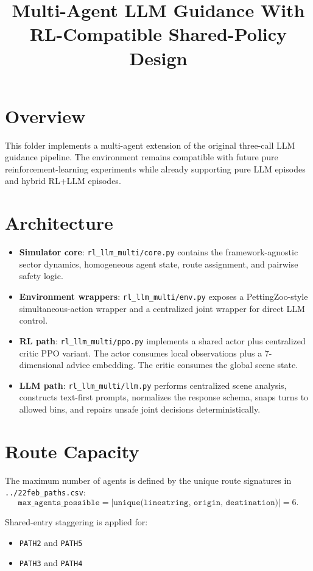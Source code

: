\documentclass[11pt]{article}
\title{Multi-Agent LLM Guidance With RL-Compatible Shared-Policy Design}
\author{}
\date{}
\begin{document}
\maketitle

\section{Overview}
This folder implements a multi-agent extension of the original three-call LLM guidance pipeline. The environment remains compatible with future pure reinforcement-learning experiments while already supporting pure LLM episodes and hybrid RL+LLM episodes.

\section{Architecture}
\begin{itemize}[leftmargin=*]
\item \textbf{Simulator core}: \texttt{rl\_llm\_multi/core.py} contains the framework-agnostic sector dynamics, homogeneous agent state, route assignment, and pairwise safety logic.
\item \textbf{Environment wrappers}: \texttt{rl\_llm\_multi/env.py} exposes a PettingZoo-style simultaneous-action wrapper and a centralized joint wrapper for direct LLM control.
\item \textbf{RL path}: \texttt{rl\_llm\_multi/ppo.py} implements a shared actor plus centralized critic PPO variant. The actor consumes local observations plus a 7-dimensional advice embedding. The critic consumes the global scene state.
\item \textbf{LLM path}: \texttt{rl\_llm\_multi/llm.py} performs centralized scene analysis, constructs text-first prompts, normalizes the response schema, snaps turns to allowed bins, and repairs unsafe joint decisions deterministically.
\end{itemize}

\section{Route Capacity}
The maximum number of agents is defined by the unique route signatures in \texttt{../22feb\_paths.csv}:
\[
\texttt{max\_agents\_possible} = \left|\texttt{unique(linestring, origin, destination)}\right| = 6.
\]

Shared-entry staggering is applied for:
\begin{itemize}[leftmargin=*]
\item \texttt{PATH2} and \texttt{PATH5}
\item \texttt{PATH3} and \texttt{PATH4}
\end{itemize}
\end{document}

